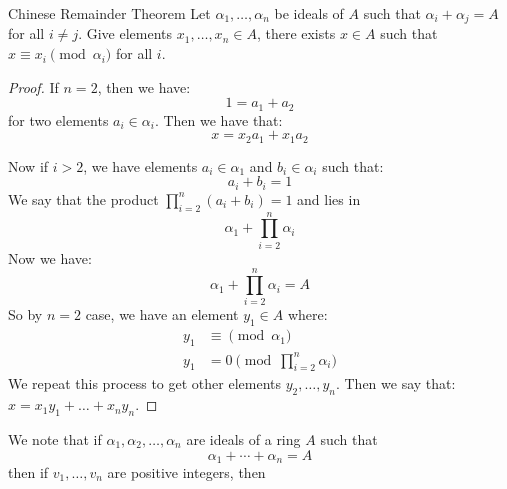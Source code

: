 \documentclass{report}
\begin{document}
\begin{theorem}{Chinese Remainder Theorem}
    Let $\alpha_{1}, \ldots, \alpha_{n}$ be ideals of $A$ such that $\alpha_{i} + \alpha_{j} = A$ for all $i \neq j$. Give elements $x_{1}, \ldots, x_{n} \in A$, there exists $x \in A$ such that $x \equiv x_{i} \pmod{\alpha_{i}}$ for all $i$.
\end{theorem}
    \begin{proof}
        If $n = 2$, then we have:
            \begin{equation*}
                1 = a_{1} + a_{2}
            \end{equation*}
        for two elements $a_{i} \in \alpha_{i}$. Then we have that:
            \begin{equation*}
                x = x_{2}a_{1} + x_{1}a_{2}
            \end{equation*}
        
        Now if $i > 2$, we have elements $a_{i} \in \alpha_{1}$ and $b_{i} \in \alpha_{i}$ such that:
            \begin{equation*}
                a_{i} + b_{i} = 1
            \end{equation*}
        We say that the product $\prod_{i = 2}^{n} (a_{i} + b_{i}) = 1$ and lies in 
            \begin{equation*}
                \alpha_{1} + \prod_{i = 2}^{n} \alpha_{i}
            \end{equation*}
        Now we have:
            \begin{equation*}
                \alpha_{1} + \prod_{i = 2}^{n} \alpha_{i} = A
            \end{equation*}
        So by $n = 2$ case, we have an element $y_{1} \in A$ where:
            \begin{align*}
                y_{1} &\equiv  \pmod{\alpha_{1}}                     \\
                y_{1} &=       0 \pmod{\prod_{i = 2}^{n} \alpha_{i}}   
            \end{align*}
        We repeat this process to get other elements $y_{2}, \ldots, y_{n}$. Then we say that: $x = x_{1}y_{1} + \ldots + x_{n}y_{n}$.
    \end{proof}
We note that if $\alpha_{1}, \alpha_{2}, \ldots, \alpha_{n}$ are ideals of a ring $A$ such that 
    \begin{equation*}
        \alpha_{1} + \cdots + \alpha_{n} = A
    \end{equation*}
then if $v_{1}, \ldots, v_{n}$ are positive integers, then 
\end{document}
